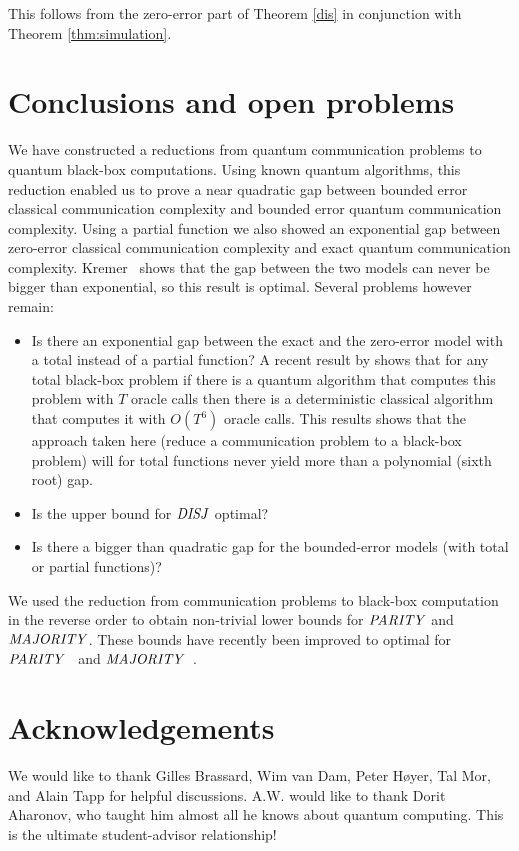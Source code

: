 This follows from the zero-error part of Theorem \ref{dis} in conjunction 
with Theorem \ref{thm:simulation}.

\section{Conclusions and open problems}
We have constructed a reductions from quantum communication problems to quantum
black-box computations. Using known quantum algorithms, this reduction enabled
us to prove a near quadratic gap between bounded error classical communication
complexity and bounded error quantum communication complexity. Using a partial
function we also showed  an exponential gap between zero-error classical
communication complexity and exact quantum communication
complexity. Kremer~\cite{Kr95} shows that the gap between the two models can
never be bigger than exponential, so this result is optimal. Several problems
however remain:
\begin{itemize}
\item Is there an exponential gap between the exact and the zero-error model
with a total instead of a partial function? A recent result by \cite{BBCMW98}
shows that for any total black-box problem if there is a quantum algorithm that
computes this problem with $T$ oracle calls then there is a deterministic
classical algorithm that computes it with $O(T^6)$ oracle calls. This results
shows that the approach taken here (reduce a communication  problem
to a black-box problem) will for total functions never yield more than a
polynomial (sixth root) gap.
\item Is the upper bound for $\mbox{\it DISJ\/}$ optimal?
\item Is there a bigger than quadratic  gap for the bounded-error models 
(with total or partial functions)? 
\end{itemize}

We used the reduction from communication  problems to black-box
computation in the reverse order to obtain non-trivial lower bounds for
$\mbox{\it PARITY\/}$ and $\mbox{\it MAJORITY\/}$. These bounds have recently been improved to optimal for
$\mbox{\it PARITY\/}$~\cite{BBCMW98,FGGS98} and $\mbox{\it MAJORITY\/}$~\cite{BBCMW98}.

\section*{Acknowledgements}
We would like to thank Gilles Brassard, Wim van Dam, Peter H\o yer, Tal Mor, 
and Alain Tapp for helpful discussions.
A.W. would like to thank Dorit Aharonov, who taught him almost all he 
knows about quantum computing. This is the ultimate student-advisor 
relationship!

